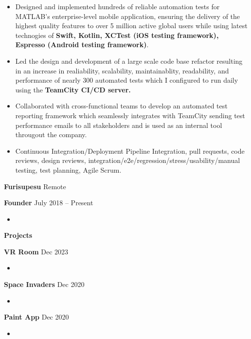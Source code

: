 \documentclass[11pt]{article}
\begin{document}
\begin{itemize}[noitemsep]
    \item Designed and implemented hundreds of reliable automation tests for MATLAB's enterprise-level mobile application,
    ensuring the delivery of the highest quality features to over 5 million active global users while using
    latest technogies of \textbf{Swift, Kotlin, XCTest (iOS testing framework), Espresso (Android testing framework)}.
    \item Led the design and development of a large scale code base refactor resulting in an increase in realiability,
    scalability, maintainablity, readability, and performance of nearly 300 automated tests which I configured to run daily using the \textbf{TeamCity CI/CD server.}
    \item Collaborated with cross-functional teams to develop an automated test reporting framework which seamlessly integrates with TeamCity sending test performance emails to all stakeholders
    and is used as an internal tool througout the company.
    \item Continuous Integration/Deployment Pipeline Integration, pull requests, code reviews, design reviews,
    integration/e2e/regression/stress/usability/manual testing, test planning, Agile Scrum.
\end{itemize}

\vspace{12pt}

\textbf{Furisupesu} \hfill Remote

\textbf{Founder} \hfill July 2018 – Present

\begin{itemize}[noitemsep]
    \item 
\end{itemize}

\begin{center}
    \textbf{Projects}
\end{center}

\textbf{VR Room} \hfill Dec 2023
\begin{itemize}
    \item 
\end{itemize}

\textbf{Space Invaders} \hfill Dec 2020
\begin{itemize}
    \item 
\end{itemize}

\textbf{Paint App} \hfill Dec 2020
\begin{itemize}
    \item 
\end{itemize}
\end{document}
